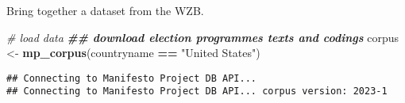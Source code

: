 \documentclass[
]{article}
\newenvironment{Shaded}{\begin{snugshade}}{\end{snugshade}}
\newcommand{\CommentTok}[1]{\textcolor[rgb]{0.56,0.35,0.01}{\textit{#1}}}
\newcommand{\DocumentationTok}[1]{\textcolor[rgb]{0.56,0.35,0.01}{\textbf{\textit{#1}}}}
\newcommand{\FunctionTok}[1]{\textcolor[rgb]{0.13,0.29,0.53}{\textbf{#1}}}
\newcommand{\NormalTok}[1]{#1}
\newcommand{\OtherTok}[1]{\textcolor[rgb]{0.56,0.35,0.01}{#1}}
\newcommand{\SpecialCharTok}[1]{\textcolor[rgb]{0.81,0.36,0.00}{\textbf{#1}}}
\newcommand{\StringTok}[1]{\textcolor[rgb]{0.31,0.60,0.02}{#1}}
\begin{document}
Bring together a dataset from the WZB.

\begin{Shaded}
\begin{Highlighting}[]
\CommentTok{\# load data}
\DocumentationTok{\#\# download election programmes texts and codings}
\NormalTok{corpus }\OtherTok{\textless{}{-}} \FunctionTok{mp\_corpus}\NormalTok{(countryname }\SpecialCharTok{==} \StringTok{"United States"}\NormalTok{)}
\end{Highlighting}
\end{Shaded}

\begin{verbatim}
## Connecting to Manifesto Project DB API... 
## Connecting to Manifesto Project DB API... corpus version: 2023-1
\end{verbatim}
\end{document}
